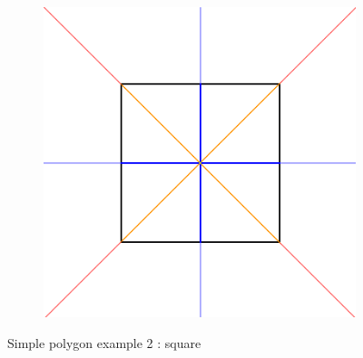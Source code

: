 \documentclass[11pt]{article}
\begin{document}
\begin{figure}[H]
\begin{subfigure}[b]{0.18\textwidth}
     \caption{}
     \label{fig:s23}
  \end{subfigure}
      \begin{subfigure}[b]{0.18\textwidth}
    \includegraphics[width=\textwidth]{FIGS/Part4/s24}
     \caption{}
     \label{fig:s24}
  \end{subfigure}
    \caption{Simple polygon example 2 : square}
    \label{fig:simple_example2}
\end{figure}
\end{document}
